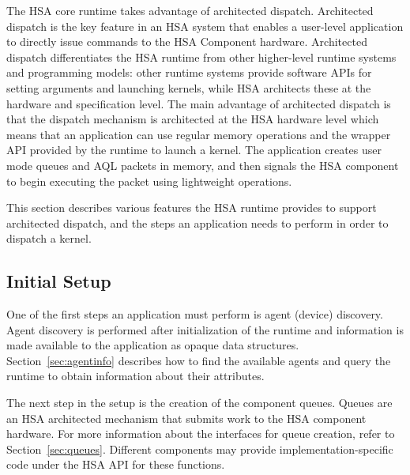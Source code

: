 \documentclass[final]{book}
\begin{document}
The HSA core runtime takes advantage of architected dispatch. Architected
dispatch is the key feature in an HSA system that enables a user-level
application to directly issue commands to the HSA Component hardware.
Architected dispatch differentiates the HSA runtime from other higher-level
runtime systems and programming models: other runtime systems provide
software APIs for setting arguments and launching kernels, while HSA architects
these at the hardware and specification level. The main advantage of architected
dispatch is that the dispatch mechanism is architected at the HSA hardware level
which means that an application can use regular memory operations and the
wrapper API provided by the runtime to launch a kernel. The application creates
user mode queues and AQL packets in memory, and then signals the HSA component
to begin executing the packet using lightweight operations.

This section describes various features the HSA runtime provides to support
architected dispatch, and the steps an application needs to perform in order to
dispatch a kernel.

\subsection{Initial Setup}
One of the first steps an application must perform is agent (device) discovery.
Agent discovery is performed after initialization of the runtime and information
is made available to the application as opaque data
structures. Section~\ref{sec:agentinfo} describes how to find the available
agents and query the runtime to obtain information about their attributes.

The next step in the setup is the creation of the component queues. Queues are an
HSA architected mechanism that submits work to the HSA component hardware. For
more information about the interfaces for queue creation, refer to
Section~\ref{sec:queues}. Different components may provide
implementation-specific code under the HSA API for these functions.

\end{document}

